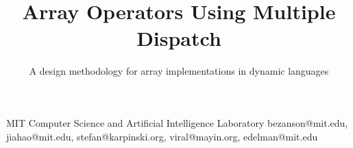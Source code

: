 \documentclass[preprint]{sigplanconf}
\begin{document}
\setlength{\pdfpageheight}{\paperheight}
\setlength{\pdfpagewidth}{\paperwidth}




\permissiontopublish             %



\title{ Array Operators Using Multiple Dispatch }
\subtitle{A design methodology for array implementations in dynamic languages}

           {MIT Computer Science and Artificial Intelligence Laboratory}
  { bezanson@mit.edu, jiahao@mit.edu, stefan@karpinski.org, viral@mayin.org, edelman@mit.edu }

\maketitle
\end{document}
